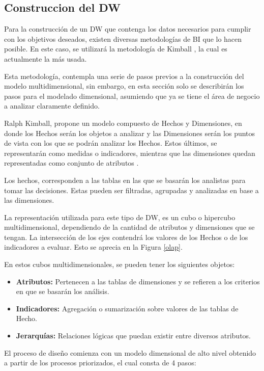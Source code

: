 \documentclass[letter,12pt,oneside]{report}
\begin{document}
\subsection{Construccion del DW}
Para la construcción de un DW que contenga los datos necesarios para cumplir con los objetivos deseados, existen diversas metodologías de BI que lo hacen posible. En este caso, se utilizará la metodología de Kimball \cite{P4}, la cual es actualmente la más usada.

Esta metodología, contempla una serie de pasos previos a la construcción del modelo multidimensional, sin embargo, en esta sección solo se describirán los pasos para el modelado dimensional, asumiendo que ya se tiene el área de negocio a analizar claramente definido.

Ralph Kimball, propone un modelo compuesto de Hechos y Dimensiones, en donde los Hechos serán los objetos a analizar y las Dimensiones serán los puntos de vista con los que se podrán analizar los Hechos. Estos últimos, se representarán como medidas o indicadores, mientras que las dimensiones quedan representadas como conjunto de atributos \cite{P5}.

Los hechos, corresponden a las tablas en las que se basarán los analistas para tomar las decisiones. Estas pueden ser filtradas, agrupadas y analizadas en base a las dimensiones. 

La representación utilizada para este tipo de DW, es un cubo o hipercubo multidimensional, dependiendo de la cantidad de atributos y dimensiones que se tengan. La intersección de los ejes contendrá los valores de los Hechos o de los indicadores a evaluar. Esto se aprecia en la Figura \ref{olap}.

En estos cubos multidimensionales, se pueden tener los siguientes objetos:

\begin{itemize}
\item \textbf{Atributos: }Pertenecen a las tablas de dimensiones y se refieren a los criterios en que se basarán los análisis.
\item \textbf{Indicadores: }Agregación o sumarización sobre valores de las tablas de Hecho.
\item \textbf{Jerarquías: }Relaciones lógicas que puedan existir entre diversos atributos.
\end{itemize}

El proceso de diseño comienza con un modelo dimensional de alto nivel obtenido a partir de los procesos priorizados, el cual consta de 4 pasos:
\end{document}
